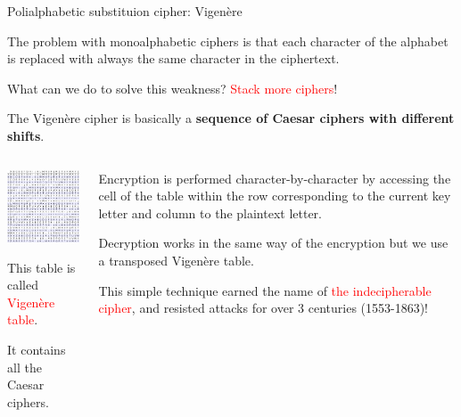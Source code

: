 \begin{frame}{Polialphabetic substituion cipher: Vigenère}
  
The problem with monoalphabetic ciphers is that each character of the alphabet is replaced with always the same character in the ciphertext.

\smallskip

What can we do to solve this weakness? \textcolor{red}{Stack more ciphers}!

The Vigenère cipher is basically a \textbf{sequence of Caesar ciphers with different shifts}.

\smallskip

  \begin{columns}
  \begin{column}{0.4\textwidth}

    \centerline{\includegraphics[width=4cm]{img/VigenereTable.png}}

    This table is called \textcolor{red}{Vigenère table}.
    
    It contains all the Caesar ciphers. 

  \end{column}
  \begin{column}{0.6\textwidth}


    Encryption is performed character-by-character by accessing the cell of the table within the row corresponding to the current key letter and column to the plaintext letter.

    Decryption works in the same way of the encryption but we use a transposed Vigenère table.

    This simple technique earned the name of \textcolor{red}{the indecipherable cipher}, and resisted attacks for over 3 centuries (1553-1863)!

  \end{column}
  \end{columns}



\end{frame}
